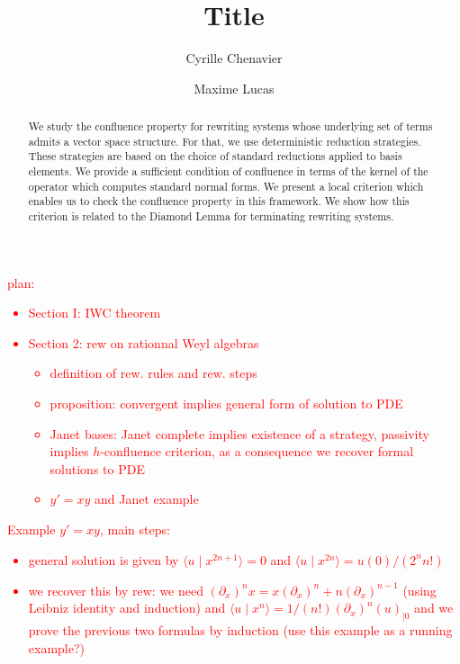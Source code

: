 \documentclass[10pt]{easychair}
\theoremstyle{definition}
\newcommand\titlePaper{{\color{red}\bf Title}}
\newcommand\todo[1]{{\bf\textcolor{red}{#1}}}
\newcommand\Span[1]{\langle#1\rangle}
\begin{document}
\title{\titlePaper}

\author{
Cyrille Chenavier
\and
Maxime Lucas
}


\titlerunning{\titlePaper}

\maketitle

\begin{abstract}
  We study the confluence property for rewriting systems whose underlying set of terms admits a vector space structure. For that, we use deterministic reduction strategies.
  These strategies are based on the choice of standard reductions applied to basis elements.
  We provide a sufficient condition of confluence in terms of the kernel of the operator which computes standard normal forms.
  We present a local criterion which enables us to check the confluence property in this framework.
  We show how this criterion is related to the Diamond Lemma for terminating rewriting systems.
\end{abstract}

\tableofcontents

\todo{plan:
  \begin{itemize}
  \item Section I: IWC theorem
  \item Section 2: rew on rationnal Weyl algebras
    \begin{itemize}
    \item definition of rew. rules and rew. steps
    \item proposition: convergent implies general form of solution to PDE
    \item Janet bases: Janet complete implies existence of a strategy, passivity implies $h$-confluence criterion, as a consequence we recover formal solutions to PDE
    \item $y'=xy$ and Janet example
    \end{itemize}
  \end{itemize}
  Example $y'=xy$, main steps:
  \begin{itemize}
  \item general solution is given by $\Span{u\mid x^{2n+1}}=0$ and $\Span{u\mid x^{2n}}=u(0)/(2^nn!)$
  \item we recover this by rew: we need $(\partial_x)^nx=x(\partial_x)^n+n(\partial_x)^{n-1}$ (using Leibniz identity and induction) and $\Span{u\mid x^n}=1/(n!)(\partial_x)^n(u)_{\mid 0}$ and we prove the previous two formulas by induction (use this example as a running example?)
  \end{itemize}
}
\end{document}
